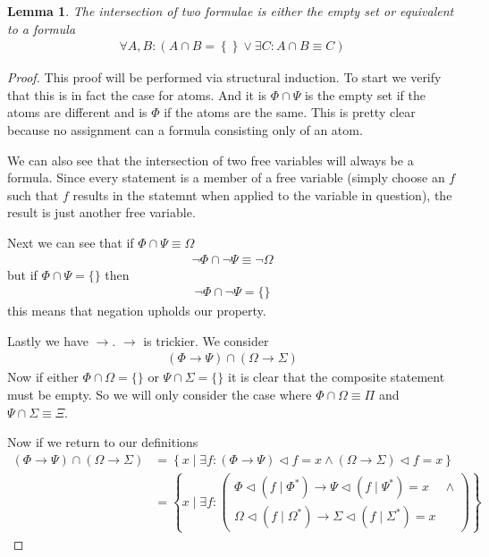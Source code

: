 \documentclass{article}
\newtheorem{lem}{Lemma}
\begin{document}
\begin{lem}
The intersection of two formulae is either the empty set or equivalent to a formula
\begin{align*}
\forall A,B : \left(A \cap B = \left\{\right\} \lor \exists C : A \cap B \equiv C \right)
\end{align*}
\end{lem}
\begin{proof}
This proof will be performed via structural induction.
To start we verify that this is in fact the case for atoms.
And it is $\Phi \cap \Psi$ is the empty set if the atoms are different and is $\Phi$ if the atoms are the same.
This is pretty clear because no assignment can a formula consisting only of an atom.

We can also see that the intersection of two free variables will always be a formula.
Since every statement is a member of a free variable (simply choose an $f$ such that $f$ results in the statemnt when applied to the variable in question),
the result is just another free variable.

Next we can see that if $\Phi \cap \Psi \equiv \Omega$
\begin{align*}
\neg \Phi \cap \neg \Psi \equiv \neg \Omega
\end{align*}
but if $\Phi \cap \Psi = \{\}$ then
\begin{align*}
\neg \Phi \cap \neg \Psi = \{\}
\end{align*}
this means that negation upholds our property.

Lastly we have $\rightarrow$.
$\rightarrow$ is trickier.
We consider
\begin{align*}
(\Phi \rightarrow \Psi) \cap (\Omega \rightarrow \Sigma)
\end{align*}
Now if either $\Phi \cap \Omega = \{\}$ or $\Psi \cap \Sigma = \{\}$ it is clear that the composite statement must be empty.
So we will only consider the case where $\Phi \cap \Omega \equiv \Pi$ and $\Psi \cap \Sigma \equiv \Xi$.

Now if we return to our definitions
\begin{align*}
(\Phi \rightarrow \Psi) \cap (\Omega \rightarrow \Sigma) &= \left\{x\mid\exists f:(\Phi \rightarrow \Psi)\lhd f = x \land (\Omega \rightarrow \Sigma) \lhd f = x\right\} \\
&= \left\{x\mid\exists f:\left(
\begin{matrix}
\Phi \lhd (f \mid \Phi^\ast) \rightarrow \Psi \lhd (f \mid \Psi^\ast) = x & \land\\
\Omega \lhd (f \mid \Omega^\ast) \rightarrow \Sigma \lhd (f \mid \Sigma^\ast) = x & 
\end{matrix}\right)\right\}
\end{align*}


\end{proof}
\end{document}
